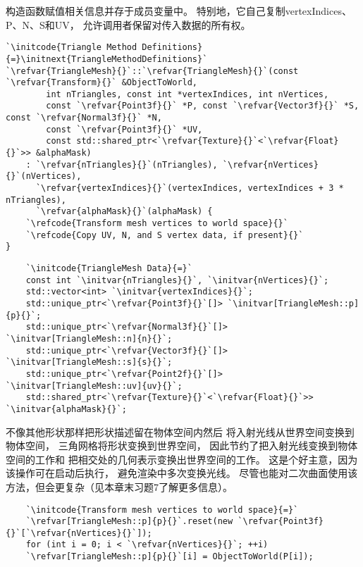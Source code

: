 构造函数赋值相关信息并存于成员变量中。
特别地，它自己复制{\ttfamily vertexIndices、P、N、S}和{\ttfamily UV}，
允许调用者保留对传入数据的所有权。
\begin{lstlisting}
`\initcode{Triangle Method Definitions}{=}\initnext{TriangleMethodDefinitions}`
`\refvar{TriangleMesh}{}`::`\refvar{TriangleMesh}{}`(const `\refvar{Transform}{}` &ObjectToWorld,
        int nTriangles, const int *vertexIndices, int nVertices,
        const `\refvar{Point3f}{}` *P, const `\refvar{Vector3f}{}` *S, const `\refvar{Normal3f}{}` *N,
        const `\refvar{Point3f}{}` *UV,
        const std::shared_ptr<`\refvar{Texture}{}`<`\refvar{Float}{}`>> &alphaMask)
    : `\refvar{nTriangles}{}`(nTriangles), `\refvar{nVertices}{}`(nVertices), 
      `\refvar{vertexIndices}{}`(vertexIndices, vertexIndices + 3 * nTriangles),
      `\refvar{alphaMask}{}`(alphaMask) {
    `\refcode{Transform mesh vertices to world space}{}`
    `\refcode{Copy UV, N, and S vertex data, if present}{}`
}
\end{lstlisting}
\begin{lstlisting}
    `\initcode{TriangleMesh Data}{=}`
    const int `\initvar{nTriangles}{}`, `\initvar{nVertices}{}`;
    std::vector<int> `\initvar{vertexIndices}{}`;
    std::unique_ptr<`\refvar{Point3f}{}`[]> `\initvar[TriangleMesh::p]{p}{}`;
    std::unique_ptr<`\refvar{Normal3f}{}`[]> `\initvar[TriangleMesh::n]{n}{}`;
    std::unique_ptr<`\refvar{Vector3f}{}`[]> `\initvar[TriangleMesh::s]{s}{}`;
    std::unique_ptr<`\refvar{Point2f}{}`[]> `\initvar[TriangleMesh::uv]{uv}{}`;
    std::shared_ptr<`\refvar{Texture}{}`<`\refvar{Float}{}`>> `\initvar{alphaMask}{}`;
\end{lstlisting}

不像其他形状那样把形状描述留在物体空间内然后
将入射光线从世界空间变换到物体空间，
三角网格将形状变换到世界空间，
因此节约了把入射光线变换到物体空间的工作和
把相交处的几何表示变换出世界空间的工作。
这是个好主意，因为该操作可在启动后执行，
避免渲染中多次变换光线。
尽管也能对二次曲面使用该方法，但会更复杂（见本章末习题7了解更多信息）。
\begin{lstlisting}
    `\initcode{Transform mesh vertices to world space}{=}`
    `\refvar[TriangleMesh::p]{p}{}`.reset(new `\refvar{Point3f}{}`[`\refvar{nVertices}{}`]);
    for (int i = 0; i < `\refvar{nVertices}{}`; ++i)
    `\refvar[TriangleMesh::p]{p}{}`[i] = ObjectToWorld(P[i]);
\end{lstlisting}

